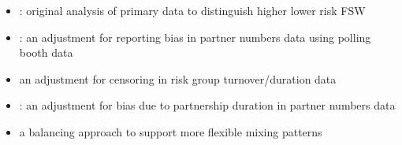 \begin{itemize}
  \item{}:
  original analysis of primary data to distinguish higher \vs lower risk FSW
  \item{}:
  an adjustment for reporting bias in partner numbers data using polling booth data
  \item{}
  an adjustment for censoring in risk group turnover/duration data
  \item{}:
  an adjustment for bias due to partnership duration in partner numbers data
  \item{}
  a balancing approach to support more flexible mixing patterns
\end{itemize}
